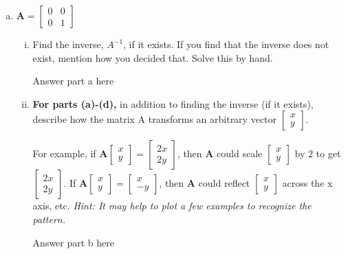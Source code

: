 \documentclass[11pt]{article}
\def\A{\textbf{A}} %
\begin{document}
\begin{enumerate}
\begin{enumerate}[(a)]
	      		      		      		               
	      		      		      		                    
	      	\newpage
	      	\item $\A = \begin{bmatrix}
	      	      0 & 0 \\
	      	      0 & 1
	      	\end{bmatrix}$
	      		      		      		
	      	\begin{enumerate}[i.]
	      		\item Find the inverse, $A^{-1}$, if it exists. If you find that the inverse does not exist, mention how you decided that. Solve this by hand.
	      		      \begin{Answer}
	      		      	Answer part a here
	      		      \end{Answer}
	      		\item \textbf{For parts (a)-(d),} in addition to finding the inverse (if it exists), describe how the matrix A transforms an arbitrary vector $\begin{bmatrix}
	      		      x \\
	      		      y
	      		\end{bmatrix}$.
	      			      			      		                    
	      		For example, if $\A \begin{bmatrix}
	      		x \\
	      		y
	      		\end{bmatrix} = \begin{bmatrix}
	      		2x \\
	      		2y
	      		\end{bmatrix}$, then $\A$ could scale $\begin{bmatrix}
	      		x \\
	      		y
	      		\end{bmatrix}$ by 2 to get $\begin{bmatrix}
	      		2x \\
	      		2y
	      		\end{bmatrix}$. If $\A \begin{bmatrix}
	      		x \\
	      		y
	      		\end{bmatrix}
	      		=
	      		\begin{bmatrix}
	      			x  \\
	      			-y 
	      		\end{bmatrix}$, then $\A$ could reflect $\begin{bmatrix}
	      		x \\
	      		y
	      		\end{bmatrix}$ across the x axis, etc. \textit{Hint: It may help to plot a few examples to recognize the pattern.}
	      		\begin{Answer}
	      			Answer part b here
	      		\end{Answer}
	      	\end{enumerate}
	      		      	

\end{enumerate}
\end{enumerate}
\end{document}
